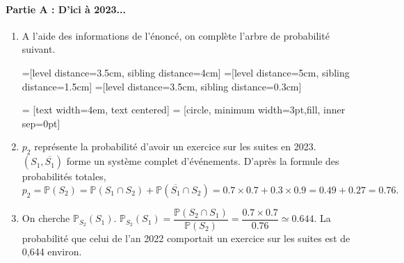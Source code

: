 \documentclass[11pt,fleqn, openany]{book} %
\begin{document}
\begin{solution}\hspace{0pt}

\paragraph{Partie A : D'ici à 2023...}


\begin{enumerate}
    \item A l'aide des informations de l'énoncé, on complète l'arbre de probabilité suivant.
    
=[level distance=3.5cm, sibling distance=4cm]
=[level distance=5cm, sibling distance=1.5cm]
=[level distance=3.5cm, sibling distance=0.3cm]

 = [text width=4em, text centered]
 = [circle, minimum width=3pt,fill, inner sep=0pt]


\begin{center}
\end{center}

    
    \item  $p_2$ représente la probabilité d'avoir un exercice sur les suites en 2023. $(S_1,\overline{S_1})$ forme un système complet d'événements. D'après la formule des probabilités totales, \[p_2=\mathbb{P}(S_2)=\mathbb{P}(S_1 \cap S_2)+\mathbb{P}(\overline{S_1}\cap S_2)=0.7 \times 0.7 + 0.3 \times 0.9 = 0.49 + 0.27=0.76.\]
    \item On cherche $\mathbb{P}_{S_2}(S_1)$. $\mathbb{P}_{S_2}(S_1)=\dfrac{\mathbb{P}(S_2 \cap S_1)}{\mathbb{P}(S_2)}=\dfrac{0.7 \times 0.7}{0.76}\simeq 0.644$. La probabilité que celui de l'an 2022 comportait un exercice sur les suites est de 0,644 environ.
\end{enumerate}



\end{solution}
\end{document}
